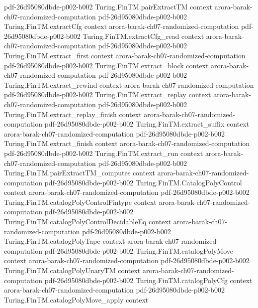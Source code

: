 \begin{theorem}
  {pdf-26d95080dbde-p002-b002}
\proofstep
  {Turing.FinTM.pairExtractTM}
  {context}
  {arora-barak-ch07-randomized-computation}
  {pdf-26d95080dbde-p002-b002}
\proofstep
  {Turing.FinTM.extractCfg}
  {context}
  {arora-barak-ch07-randomized-computation}
  {pdf-26d95080dbde-p002-b002}
\proofstep
  {Turing.FinTM.extractCfg_read}
  {context}
  {arora-barak-ch07-randomized-computation}
  {pdf-26d95080dbde-p002-b002}
\proofstep
  {Turing.FinTM.extract_first}
  {context}
  {arora-barak-ch07-randomized-computation}
  {pdf-26d95080dbde-p002-b002}
\proofstep
  {Turing.FinTM.extract_block}
  {context}
  {arora-barak-ch07-randomized-computation}
  {pdf-26d95080dbde-p002-b002}
\proofstep
  {Turing.FinTM.extract_rewind}
  {context}
  {arora-barak-ch07-randomized-computation}
  {pdf-26d95080dbde-p002-b002}
\proofstep
  {Turing.FinTM.extract_replay}
  {context}
  {arora-barak-ch07-randomized-computation}
  {pdf-26d95080dbde-p002-b002}
\proofstep
  {Turing.FinTM.extract_replay_finish}
  {context}
  {arora-barak-ch07-randomized-computation}
  {pdf-26d95080dbde-p002-b002}
\proofstep
  {Turing.FinTM.extract_suffix}
  {context}
  {arora-barak-ch07-randomized-computation}
  {pdf-26d95080dbde-p002-b002}
\proofstep
  {Turing.FinTM.extract_finish}
  {context}
  {arora-barak-ch07-randomized-computation}
  {pdf-26d95080dbde-p002-b002}
\proofstep
  {Turing.FinTM.extract_run}
  {context}
  {arora-barak-ch07-randomized-computation}
  {pdf-26d95080dbde-p002-b002}
\proofstep
  {Turing.FinTM.pairExtractTM_computes}
  {context}
  {arora-barak-ch07-randomized-computation}
  {pdf-26d95080dbde-p002-b002}
\proofstep
  {Turing.FinTM.CatalogPolyControl}
  {context}
  {arora-barak-ch07-randomized-computation}
  {pdf-26d95080dbde-p002-b002}
\proofstep
  {Turing.FinTM.catalogPolyControlFintype}
  {context}
  {arora-barak-ch07-randomized-computation}
  {pdf-26d95080dbde-p002-b002}
\proofstep
  {Turing.FinTM.catalogPolyControlDecidableEq}
  {context}
  {arora-barak-ch07-randomized-computation}
  {pdf-26d95080dbde-p002-b002}
\proofstep
  {Turing.FinTM.catalogPolyTape}
  {context}
  {arora-barak-ch07-randomized-computation}
  {pdf-26d95080dbde-p002-b002}
\proofstep
  {Turing.FinTM.catalogPolyMove}
  {context}
  {arora-barak-ch07-randomized-computation}
  {pdf-26d95080dbde-p002-b002}
\proofstep
  {Turing.FinTM.catalogPolyUnaryTM}
  {context}
  {arora-barak-ch07-randomized-computation}
  {pdf-26d95080dbde-p002-b002}
\proofstep
  {Turing.FinTM.catalogPolyCfg}
  {context}
  {arora-barak-ch07-randomized-computation}
  {pdf-26d95080dbde-p002-b002}
\proofstep
  {Turing.FinTM.catalogPolyMove_apply}
  {context}

\end{theorem}
